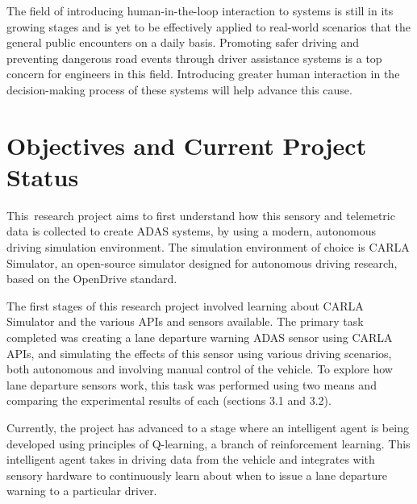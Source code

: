 \documentclass[12pt]{article}
\renewcommand{\_}{\kern-1.5pt\textunderscore\kern-1.5pt}
\begin{document}
\vspace{\baselineskip}
The field of introducing human-in-the-loop interaction to systems is still in its growing stages and is yet to be effectively applied to real-world scenarios that the general public encounters on a daily basis. Promoting safer driving and preventing dangerous road events through driver assistance systems is a top concern for engineers in this field. Introducing greater human interaction in the decision-making process of these systems will help advance this cause.\par

\section{Objectives and Current Project Status}
This\ research project aims to first understand how this sensory and telemetric data is collected to create ADAS systems, by using a modern, autonomous driving simulation environment. The simulation environment of choice is CARLA Simulator, an open-source simulator designed for autonomous driving research, based on the OpenDrive standard. \par %


\vspace{\baselineskip}
The first stages of this research project involved learning about CARLA Simulator and the various APIs and sensors available. The primary task completed was creating a lane departure warning ADAS sensor using CARLA APIs, and simulating the effects of this sensor using various driving scenarios, both autonomous and involving manual control of the vehicle. To explore how lane departure sensors work, this task was performed using two means and comparing the experimental results of each (sections 3.1 and 3.2).\par

\vspace{\baselineskip}
Currently, the project has advanced to a stage where an intelligent agent is being developed using principles of Q-learning, a branch of reinforcement learning. This intelligent agent takes in driving data from the vehicle and integrates with sensory hardware to continuously learn about when to issue a lane departure warning to a particular driver.\par
\end{document}

